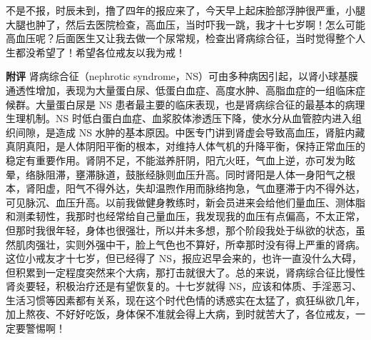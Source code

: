 \begin{case}
    不是不报，时辰未到，撸了四年的报应来了，今天早上起床脸部浮肿很严重，小腿大腿也肿了，然后去医院检查，高血压，当时吓我一跳，我才十七岁啊！怎么可能高血压呢？后面医生又让我去做一个尿常规，检查出肾病综合征，当时觉得整个人生都没希望了！希望各位戒友以我为戒！

    \textbf{附评} 肾病综合征（nephrotic syndrome，NS）可由多种病因引起，以肾小球基膜通透性增加，表现为大量蛋白尿、低蛋白血症、高度水肿、高脂血症的一组临床症候群。大量蛋白尿是 NS 患者最主要的临床表现，也是肾病综合征的最基本的病理生理机制。NS 时低白蛋白血症、血浆胶体渗透压下降，使水分从血管腔内进入组织间隙，是造成 NS 水肿的基本原因。中医专门讲到肾虚会导致高血压，肾脏内藏真阴真阳，是人体阴阳平衡的根本，对维持人体气机的升降平衡，保持正常血压的稳定有重要作用。肾阴不足，不能滋养肝阴，阳亢火旺，气血上逆，亦可发为眩晕，络脉阻滞，壅滞脉道，鼓胀经脉则血压升高。同时肾阳是人体一身阳气之根本，肾阳虚，阳气不得外达，失却温煦作用而脉络拘急，气血壅滞于内不得外达，可见脉沉、血压升高。以前我做健身教练时，新会员进来会给他们量血压、测体脂和测柔韧性，我那时也经常给自己量血压，我发现我的血压有点偏高，不太正常，但那时我很年轻，身体也很强壮，所以并未多想，那个阶段我处于纵欲的状态，虽然肌肉强壮，实则外强中干，脸上气色也不算好，所幸那时没有得上严重的肾病。这位小戒友才十七岁，但已经得了 NS，报应迟早会来的，也许一直没什么大碍，但积累到一定程度突然来个大病，那打击就很大了。总的来说，肾病综合征比慢性肾炎要轻，积极治疗还是有望恢复的。十七岁就得 NS，应该和体质、手淫恶习、生活习惯等因素都有关系，现在这个时代色情的诱惑实在太猛了，疯狂纵欲几年，加上熬夜、不好好吃饭，身体保不准就会得上大病，到时就苦大了，各位戒友，一定要警惕啊！
\end{case}

